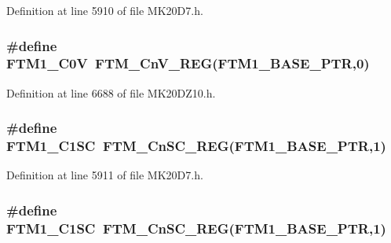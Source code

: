 Definition at line 5910 of file M\+K20\+D7.\+h.

\subsubsection[{\texorpdfstring{F\+T\+M1\+\_\+\+C0V}{FTM1_C0V}}]{\setlength{\rightskip}{0pt plus 5cm}\#define F\+T\+M1\+\_\+\+C0V~{\bf F\+T\+M\+\_\+\+Cn\+V\+\_\+\+R\+EG}({\bf F\+T\+M1\+\_\+\+B\+A\+S\+E\+\_\+\+P\+TR},0)}\hypertarget{group___f_t_m___register___accessor___macros_ga5ff1e1bfd9de0887b077af86dfa74469}{}\label{group___f_t_m___register___accessor___macros_ga5ff1e1bfd9de0887b077af86dfa74469}


Definition at line 6688 of file M\+K20\+D\+Z10.\+h.

\subsubsection[{\texorpdfstring{F\+T\+M1\+\_\+\+C1\+SC}{FTM1_C1SC}}]{\setlength{\rightskip}{0pt plus 5cm}\#define F\+T\+M1\+\_\+\+C1\+SC~{\bf F\+T\+M\+\_\+\+Cn\+S\+C\+\_\+\+R\+EG}({\bf F\+T\+M1\+\_\+\+B\+A\+S\+E\+\_\+\+P\+TR},1)}\hypertarget{group___f_t_m___register___accessor___macros_ga276fd16304067a9c337b2e116f9d692b}{}\label{group___f_t_m___register___accessor___macros_ga276fd16304067a9c337b2e116f9d692b}


Definition at line 5911 of file M\+K20\+D7.\+h.

\subsubsection[{\texorpdfstring{F\+T\+M1\+\_\+\+C1\+SC}{FTM1_C1SC}}]{\setlength{\rightskip}{0pt plus 5cm}\#define F\+T\+M1\+\_\+\+C1\+SC~{\bf F\+T\+M\+\_\+\+Cn\+S\+C\+\_\+\+R\+EG}({\bf F\+T\+M1\+\_\+\+B\+A\+S\+E\+\_\+\+P\+TR},1)}\hypertarget{group___f_t_m___register___accessor___macros_ga276fd16304067a9c337b2e116f9d692b}{}\label{group___f_t_m___register___accessor___macros_ga276fd16304067a9c337b2e116f9d692b}


